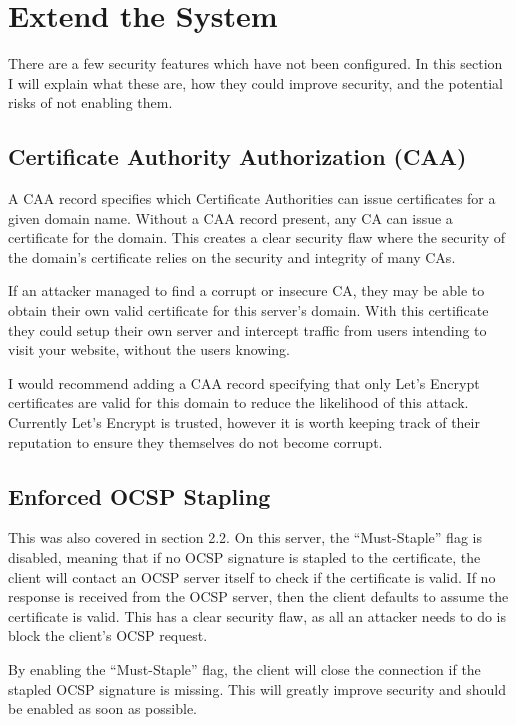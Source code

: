 \documentclass[12pt]{article}
\begin{document}
  \section{Extend the System}

  There are a few security features which have not been configured.
  In this section I will explain what these are, how they could improve security, and the potential risks of not enabling them.

  \subsection{Certificate Authority Authorization (CAA)}
  A CAA record specifies which Certificate Authorities can issue certificates for a given domain name.
  Without a CAA record present, any CA can issue a certificate for the domain.
  This creates a clear security flaw where the security of the domain's certificate relies on the security and integrity of many CAs.
  
  If an attacker managed to find a corrupt or insecure CA, they may be able to obtain their own valid certificate for this server's domain.
  With this certificate they could setup their own server and intercept traffic from users intending to visit your website, without the users knowing.

  I would recommend adding a CAA record specifying that only Let's Encrypt certificates are valid for this domain to reduce the likelihood of this attack.
  Currently Let's Encrypt is trusted, however it is worth keeping track of their reputation to ensure they themselves do not become corrupt.


  \subsection{Enforced OCSP Stapling}
  This was also covered in section 2.2.
  On this server, the ``Must-Staple'' flag is disabled, meaning that if no OCSP signature is stapled to the certificate, the client will contact an OCSP server itself to check if the certificate is valid.
  If no response is received from the OCSP server, then the client defaults to assume the certificate is valid.
  This has a clear security flaw, as all an attacker needs to do is block the client's OCSP request.

  By enabling the ``Must-Staple'' flag, the client will close the connection if the stapled OCSP signature is missing.
  This will greatly improve security and should be enabled as soon as possible.
\end{document}
